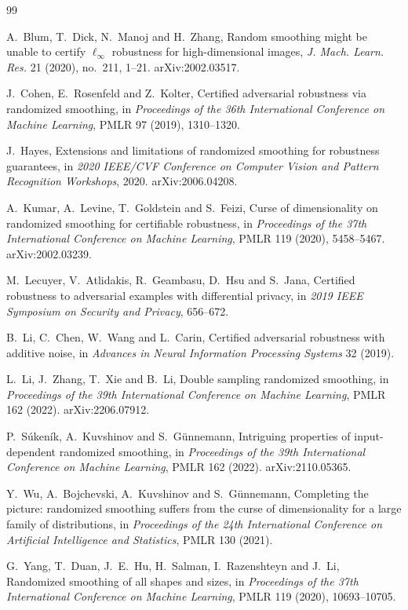 \documentclass[11pt]{amsart}
\theoremstyle{definition}
\theoremstyle{remark}
\begin{document}
\begin{thebibliography}{99}

A.~Blum, T.~Dick, N.~Manoj and H.~Zhang, Random smoothing might be unable to certify $\ell_\infty$ robustness
for high-dimensional images, \emph{J. Mach. Learn. Res.} 21 (2020), no.~211, 1--21. arXiv:2002.03517.

J.~Cohen, E.~Rosenfeld and Z.~Kolter, Certified adversarial robustness via randomized smoothing, in
\emph{Proceedings of the 36th International Conference on Machine Learning}, PMLR 97 (2019), 1310--1320.

J.~Hayes, Extensions and limitations of randomized smoothing for robustness guarantees, in \emph{2020 IEEE/CVF
Conference on Computer Vision and Pattern Recognition Workshops}, 2020. arXiv:2006.04208.

A.~Kumar, A.~Levine, T.~Goldstein and S.~Feizi, Curse of dimensionality on randomized smoothing for certifiable
robustness, in \emph{Proceedings of the 37th International Conference on Machine Learning}, PMLR 119 (2020),
5458--5467. arXiv:2002.03239.

M.~Lecuyer, V.~Atlidakis, R.~Geambasu, D.~Hsu and S.~Jana, Certified robustness to adversarial examples with
differential privacy, in \emph{2019 IEEE Symposium on Security and Privacy}, 656--672.

B.~Li, C.~Chen, W.~Wang and L.~Carin, Certified adversarial robustness with additive noise, in \emph{Advances in
Neural Information Processing Systems} 32 (2019).

L.~Li, J.~Zhang, T.~Xie and B.~Li, Double sampling randomized smoothing, in \emph{Proceedings of the 39th
International Conference on Machine Learning}, PMLR 162 (2022). arXiv:2206.07912.

P.~S\'uken\'ik, A.~Kuvshinov and S.~G\"unnemann, Intriguing properties of input-dependent randomized smoothing,
in \emph{Proceedings of the 39th International Conference on Machine Learning}, PMLR 162 (2022). arXiv:2110.05365.

Y.~Wu, A.~Bojchevski, A.~Kuvshinov and S.~G\"unnemann, Completing the picture: randomized smoothing suffers from
the curse of dimensionality for a large family of distributions, in \emph{Proceedings of the 24th International
Conference on Artificial Intelligence and Statistics}, PMLR 130 (2021).

G.~Yang, T.~Duan, J.~E.~Hu, H.~Salman, I.~Razenshteyn and J.~Li, Randomized smoothing of all shapes and sizes, in
\emph{Proceedings of the 37th International Conference on Machine Learning}, PMLR 119 (2020), 10693--10705.


\end{thebibliography}
\end{document}
